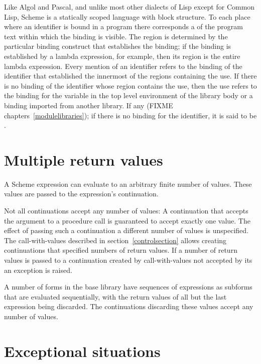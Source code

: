 
\vest Like Algol and Pascal, and unlike most other dialects of Lisp
except for Common Lisp, Scheme is a statically scoped language with
block structure.  To each place where an identifier is bound in a program
there corresponds a  of the program text within which
the binding is visible.  The region is determined by the particular
binding construct that establishes the binding; if the binding is
established by a {\cf lambda} expression, for example, then its region
is the entire {\cf lambda} expression.  Every mention of an identifier
refers to the binding of the identifier that established the
innermost of the regions containing the use.  If there is no binding of
the identifier whose region contains the use, then the use refers to the
binding for the variable in the top level environment of the library
body or a binding imported from another library.  If any
(FIXME chapters~\ref{modulelibraries}); if there is no
binding for the identifier,
it is said to be .

\section{Multiple return values}

A Scheme expression can evaluate to an arbitrary finite number of
values.  These values are passed to the expression's continuation.

Not all continuations accept any number of values: A continuation that
accepts the argument to a procedure call is guaranteed to accept
exactly one value.  The effect of passing such a continuation a
different number of values is unspecified.  The {\cf call-with-values}
described in section~\ref{controlsection} allows creating
continuations that specified numbers of return values.  If a number of
return values is passed to a continuation created by {\cf
  call-with-values} not accepted by its  an exception is
raised.

A number of forms in the base library have sequences of expressions
as subforms that are evaluated sequentially, with the return values of
all but the last expression being discarded.  The continuations
discarding these values accept any number of values.

\section{Exceptional situations}
\label{exceptionalsituationsection}

